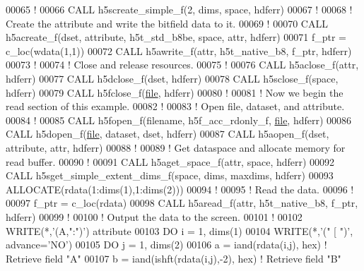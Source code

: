 \begin{DoxyCode}
00065   \textcolor{comment}{!}
00066   \textcolor{keyword}{CALL }h5screate\_simple\_f(2, dims, space, hdferr)
00067   \textcolor{comment}{!}
00068   \textcolor{comment}{! Create the attribute and write the bitfield data to it.}
00069   \textcolor{comment}{!}
00070   \textcolor{keyword}{CALL }h5acreate\_f(dset, attribute,  h5t\_std\_b8be, space, attr, hdferr)
00071   f\_ptr = c\_loc(wdata(1,1))
00072   \textcolor{keyword}{CALL }h5awrite\_f(attr, h5t\_native\_b8, f\_ptr, hdferr)
00073   \textcolor{comment}{!}
00074   \textcolor{comment}{! Close and release resources.}
00075   \textcolor{comment}{!}
00076   \textcolor{keyword}{CALL }h5aclose\_f(attr, hdferr)
00077   \textcolor{keyword}{CALL }h5dclose\_f(dset, hdferr)
00078   \textcolor{keyword}{CALL }h5sclose\_f(space, hdferr)
00079   \textcolor{keyword}{CALL }h5fclose\_f(\hyperlink{structfile}{file}, hdferr)
00080   \textcolor{comment}{!}
00081   \textcolor{comment}{! Now we begin the read section of this example. }
00082   \textcolor{comment}{!}
00083   \textcolor{comment}{! Open file, dataset, and attribute.}
00084   \textcolor{comment}{!}
00085   \textcolor{keyword}{CALL }h5fopen\_f(filename, h5f\_acc\_rdonly\_f, \hyperlink{structfile}{file}, hdferr)
00086   \textcolor{keyword}{CALL }h5dopen\_f(\hyperlink{structfile}{file}, dataset, dset, hdferr)
00087   \textcolor{keyword}{CALL }h5aopen\_f(dset, attribute, attr, hdferr)
00088   \textcolor{comment}{!}
00089   \textcolor{comment}{! Get dataspace and allocate memory for read buffer.}
00090   \textcolor{comment}{!}
00091   \textcolor{keyword}{CALL }h5aget\_space\_f(attr, space, hdferr)
00092   \textcolor{keyword}{CALL }h5sget\_simple\_extent\_dims\_f(space, dims, maxdims, hdferr)
00093   \textcolor{keyword}{ALLOCATE}(rdata(1:dims(1),1:dims(2)))
00094   \textcolor{comment}{!}
00095   \textcolor{comment}{! Read the data.}
00096   \textcolor{comment}{!}
00097   f\_ptr = c\_loc(rdata)
00098   \textcolor{keyword}{CALL }h5aread\_f(attr,  h5t\_native\_b8, f\_ptr, hdferr)
00099   \textcolor{comment}{!}
00100   \textcolor{comment}{! Output the data to the screen.}
00101   \textcolor{comment}{!}
00102   \textcolor{keyword}{WRITE}(*,\textcolor{stringliteral}{'(A,":")'}) attribute
00103   \textcolor{keywordflow}{DO} i = 1, dims(1)
00104      \textcolor{keyword}{WRITE}(*,\textcolor{stringliteral}{'(" [ ")'}, advance=\textcolor{stringliteral}{'NO'})
00105      \textcolor{keywordflow}{DO} j = 1, dims(2)
00106         a = iand(rdata(i,j), hex) \textcolor{comment}{! Retrieve field "A"}
00107         b = iand(ishft(rdata(i,j),-2), hex) \textcolor{comment}{! Retrieve field "B"}

\end{DoxyCode}
